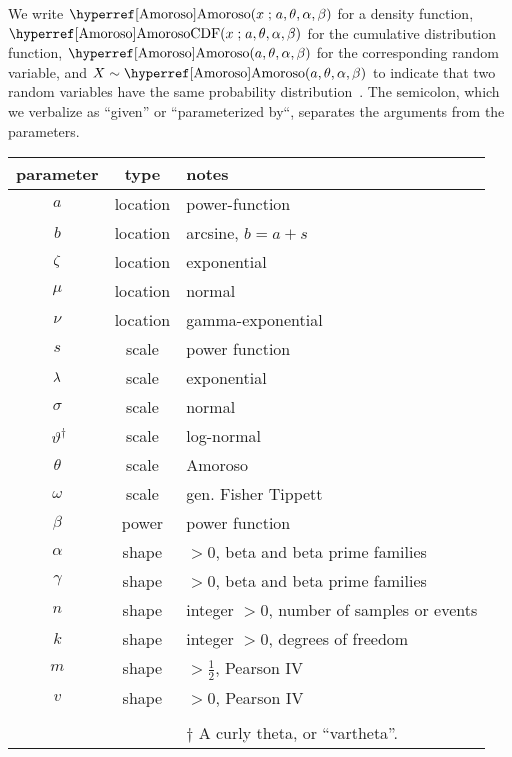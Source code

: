 


\label{sec:notation}

We write  $\opr{Amoroso}(x\given a, \theta, \alpha, \beta)$ for a density function,  $\oprr{AmorosoCDF}{Amoroso}(x\given a, \theta, \alpha, \beta)$ for the cumulative distribution function, $\opr{Amoroso}(a, \theta, \alpha, \beta)$ for the corresponding random variable,  and  $X\sim\opr{Amoroso}(a, \theta, \alpha, \beta)$ to indicate that two random variables have the same probability distribution~\cite{Gelman2004}. The semicolon, which we verbalize as ``given'' or ``parameterized by``, separates the arguments from the parameters.   

\begin{center}
\begin{tabular}{ccl}
parameter & type &  notes\\
\hline
$a$			&location& power-function \\
$b$			&location& arcsine, $b= a+s$\\
$\zeta$		 & location &	exponential \\
$\mu$		 & location & normal \\
$\nu$	& location & gamma-exponential \\	%
$s$			&scale& power function\\
$\lambda$		 & scale & 		exponential \\
$\sigma$		 & scale	& normal\\
$\ \vartheta^\dagger$ & scale&	log-normal \\
$\theta$		& scale & Amoroso \\
$\omega$		 &scale& gen. Fisher Tippett \\
$\beta$		& power & power function	 \\
$\alpha$		& shape	& $>0$, beta and beta prime families \\
$\gamma$	& shape	& $>0$, beta and beta prime families \\
$n$			 &  shape& integer $>0$, number of samples  or events\\
$k$	& shape	& integer $>0$, degrees of freedom\\%
$m$   		& shape & $>\tfrac{1}{2}$, Pearson IV\\
$v$			& shape & $>0$, Pearson IV\\ %
\\
&& \footnotesize{$\dagger$ A curly theta, or ``vartheta''.}
\end{tabular}
\end{center}


